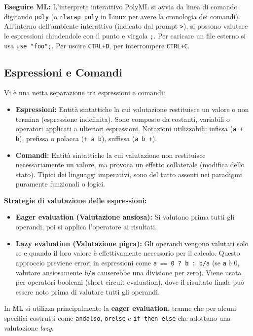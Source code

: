 \documentclass[12pt, a4paper]{article}
\begin{document}
\textbf{Eseguire ML:}
L'interprete interattivo PolyML si avvia da linea di comando digitando \texttt{poly} (o \texttt{rlwrap poly} in Linux per avere la cronologia dei comandi). All'interno dell'ambiente interattivo (indicato dal prompt \texttt{>}), si possono valutare le espressioni chiudendole con il punto e virgola \texttt{;}. Per caricare un file esterno si usa \texttt{use "foo";}. Per uscire \texttt{CTRL+D}, per interrompere \texttt{CTRL+C}.  

\subsection{Espressioni e Comandi}
Vi è una netta separazione tra espressioni e comandi:
\begin{itemize}
\item \textbf{Espressioni:} Entità sintattiche la cui valutazione restituisce un valore o non termina (espressione indefinita). Sono composte da costanti, variabili o operatori applicati a ulteriori espressioni. Notazioni utilizzabili: infissa (\texttt{a + b}), prefissa o polacca (\texttt{+ a b}), suffissa (\texttt{a b +}).
\item \textbf{Comandi:} Entità sintattiche la cui valutazione non restituisce necessariamente un valore, ma provoca un effetto collaterale (modifica dello stato). Tipici dei linguaggi imperativi, sono del tutto assenti nei paradigmi puramente funzionali o logici.
\end{itemize}  

\newpage

\textbf{Strategie di valutazione delle espressioni:}
\begin{itemize}
\item \textbf{Eager evaluation (Valutazione ansiosa):} Si valutano prima tutti gli operandi, poi si applica l'operatore ai risultati.
\item \textbf{Lazy evaluation (Valutazione pigra):} Gli operandi vengono valutati solo se e quando il loro valore è effettivamente necessario per il calcolo. Questo approccio previene errori in espressioni come \texttt{a == 0 ? b : b/a} (se \texttt{a} è 0, valutare ansiosamente \texttt{b/a} causerebbe una divisione per zero). Viene usata per operatori booleani (short-circuit evaluation), dove il risultato finale può essere noto prima di valutare tutti gli operandi.
\end{itemize}
In ML si utilizza principalmente la \textbf{eager evaluation}, tranne che per alcuni specifici costrutti come \texttt{andalso}, \texttt{orelse} e \texttt{if-then-else} che adottano una valutazione \textit{lazy}.  
\end{document}
